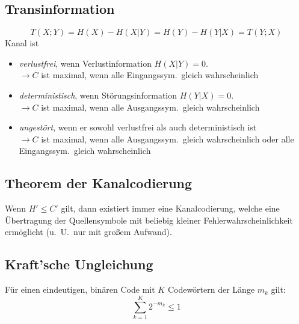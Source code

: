 \subsection*{Transinformation}
\[
    T(X; Y) = H(X) - H(X | Y) = H(Y) - H(Y | X) = T(Y; X)
\]
Kanal ist 
\begin{itemize}
	\setlength{\parskip}{0pt}
	\setlength{\itemsep}{0pt plus 1pt}
    \item \textit{verlustfrei}, wenn Verlustinformation $ H(X | Y) = 0. $ \\
        $ \rightarrow C $ ist maximal, wenn alle Eingangssym.\ gleich
        wahrscheinlich
    \item \textit{deterministisch}, wenn Störungsinformation $ H(Y | X) = 0. $ \\
        $ \rightarrow C $ ist maximal, wenn alle Ausgangssym.\ gleich
        wahrscheinlich
    \item \textit{ungestört}, wenn er sowohl verlustfrei als auch
        deterministisch ist \\
        $ \rightarrow C $ ist maximal, wenn alle Ausgangssym.\ gleich
        wahrscheinlich oder alle Eingangssym.\ gleich wahrscheinlich
\end{itemize}

\subsection*{Theorem der Kanalcodierung}
Wenn $ H' \leq C' $ gilt, dann existiert immer eine Kanalcodierung, welche eine
Übertragung der Quellensymbole mit beliebig kleiner Fehlerwahrscheinlichkeit
ermöglicht (u.\ U.\ nur mit großem Aufwand).

\subsection*{Kraft'sche Ungleichung}
Für einen eindeutigen, binären Code mit $ K $ Codewörtern der Länge $ m_k $ gilt:
\[
    \sum_{k=1}^{K} 2^{-m_k} \le 1
\]

